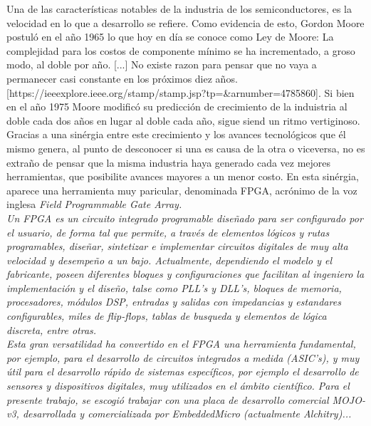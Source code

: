 
	Una de las características notables de la industria de los semiconductores, es la velocidad en lo que a desarrollo se refiere. Como evidencia de esto, Gordon Moore postuló en el año 1965 lo que 
hoy en día se conoce como Ley de Moore: La complejidad para los costos de componente mínimo se ha incrementado, a groso modo, al doble por año. [...] No existe razon para pensar que no vaya a permanecer casi
constante en los próximos diez años.[https://ieeexplore.ieee.org/stamp/stamp.jsp?tp=&arnumber=4785860]. Si bien en el año 1975 Moore modificó su predicción de crecimiento de la induistria al doble cada dos años
en lugar al doble cada año, sigue siend un ritmo vertiginoso.\\
	Gracias a una sinérgia entre este crecimiento y los avances tecnológicos que él mismo genera, al punto de desconocer si una es causa de la otra o viceversa, no es extraño de pensar que la misma industria haya
generado cada vez mejores herramientas, que posibilite avances mayores a un menor costo. En esta sinérgia, aparece una herramienta muy paricular, denominada FPGA, acrónimo de la voz inglesa \it{Field 
Programmable Gate Array}.\\
	Un FPGA es un circuito integrado programable diseñado para ser configurado por el usuario, de forma tal que permite, a través de elementos lógicos y rutas programables, diseñar, sintetizar e implementar
circuitos digitales de muy alta velocidad y desempeño a un bajo. Actualmente, dependiendo el modelo y el fabricante, poseen diferentes bloques y configuraciones que facilitan al ingeniero la implementación y el diseño,
talse como PLL's y DLL's, bloques de memoria, procesadores, módulos DSP, entradas y salidas con impedancias y estandares configurables, miles de flip-flops, tablas de busqueda y elementos de lógica discreta, entre otras.\\
	Esta gran versatilidad ha convertido en el FPGA una herramienta fundamental, por ejemplo, para el desarrollo de circuitos integrados a medida (ASIC's), y muy útil para el desarrollo rápido de sistemas específicos,
por ejemplo el desarrollo de sensores y dispositivos digitales, muy utilizados en el ámbito científico.
	Para el presente trabajo, se escogió trabajar con una placa de desarrollo comercial MOJO-v3, desarrollada y comercializada por EmbeddedMicro (actualmente Alchitry)... %


